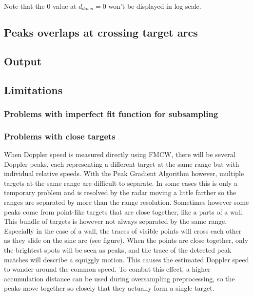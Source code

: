 Note that the \(0\) value at \(d_{down}=0\) won't be displayed in log
scale.

\subsection{Peaks overlaps at crossing target
arcs}\label{peaks-overlaps-at-crossing-target-arcs}

\subsection{Output}\label{output}

\subsection{Limitations}\label{limitations-1}

\subsubsection{Problems with imperfect fit function for
subsampling}\label{problems-with-imperfect-fit-function-for-subsampling}

\subsubsection{Problems with close
targets}\label{problems-with-close-targets}

When Doppler speed is measured directly using FMCW, there will be
several Doppler peaks, each representing a different target at the same
range but with individual relative speeds. With the Peak Gradient
Algorithm however, multiple targets at the same range are difficult to
separate. In some cases this is only a temporary problem and is resolved
by the radar moving a little farther so the ranges are separated by more
than the range resolution. Sometimes however some peaks come from
point-like targets that are close together, like a parts of a wall. This
bundle of targets is however not always separated by the same range.
Especially in the case of a wall, the traces of visible points will
cross each other as they slide on the sine arc (see figure). When the
points are close together, only the brightest spots will be seen as
peaks, and the trace of the detected peak matches will describe a
squiggly motion. This causes the estimated Doppler speed to wander
around the common speed. To combat this effect, a higher accumulation
distance can be used during oversampling preprocessing, so the peaks
move together so closely that they actually form a single target.


